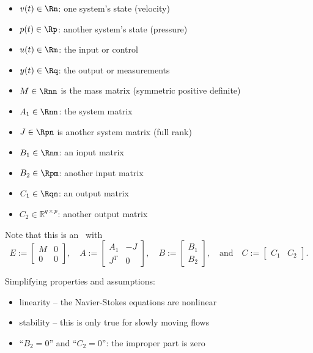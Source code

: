 \begin{itemize}
	\item $v(t) \in \Rn$: one system's state (velocity)
	\item $p(t) \in \Rp$: another system's state (pressure)
	\item $u(t) \in \Rm$: the input or control
	\item $y(t) \in \Rq$: the output or measurements
	\item $M \in \Rnn$ is the mass matrix (symmetric positive definite)
	\item $A_1 \in \Rnn$: the system matrix
	\item $J \in \Rpn$ is another system matrix (full rank)
	\item $B_1 \in \Rnm$: an input matrix
	\item $B_2 \in \Rpm$: another input matrix
	\item $C_1 \in \Rqn$: an output matrix
	\item $C_2 \in \mathbb R^{q\times p} $: another output matrix
\end{itemize}

Note that this is an \eabcsys~with
\begin{equation*}
	E:= \begin{bmatrix} M & 0 \\ 0 & 0 \end{bmatrix}, \quad
	A:= \begin{bmatrix} A_1 & -J \\ J^T & 0 \end{bmatrix}, \quad
	B:= \begin{bmatrix} B_1 \\ B_2\end{bmatrix}, \quad \text{and}\quad
	C:= \begin{bmatrix} C_1 & C_2 \end{bmatrix}.
\end{equation*}

Simplifying properties and assumptions:
\begin{itemize}
	\item linearity -- the Navier-Stokes equations are nonlinear
	\item stability -- this is only true for slowly moving flows
	\item ``$B_2=0$'' and ``$C_2=0$'': the improper part is zero
\end{itemize}

